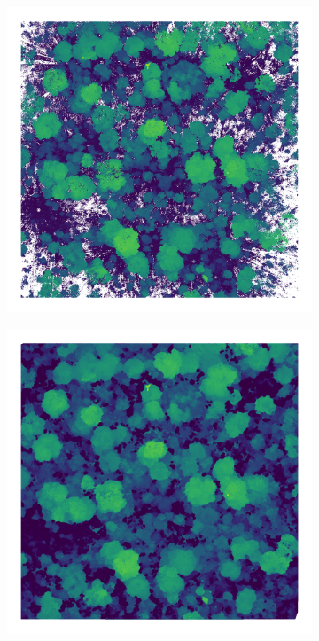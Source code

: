 \begin{refsection}
\begin{figure}
	\begin{subfigure}{0.45\linewidth}
		\includegraphics[width=\linewidth]{img/P1_raw}
		\caption{}
		\label{workflow:P1_raw}
	\end{subfigure}
	\hfill
	\begin{subfigure}{0.45\linewidth}
		\includegraphics[width=\linewidth]{img/P1_pit}

\end{subfigure}
\end{figure}
\end{refsection}
